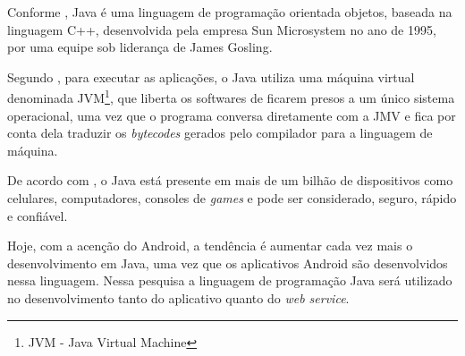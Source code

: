 
	\par Conforme , Java é uma linguagem de programação
orientada objetos, baseada na linguagem C++, desenvolvida pela empresa
Sun Microsystem no ano de {1995}, por uma equipe sob liderança de James
Gosling.

	\par Segundo , para executar as aplicações, o
Java utiliza uma máquina virtual denominada JVM\footnote{JVM - Java
Virtual Machine}, que liberta os softwares de ficarem presos a um único sistema
operacional, uma vez que o programa conversa diretamente com a JMV e fica por
conta dela traduzir os \textit{bytecodes} gerados pelo compilador para a
linguagem de máquina.

	\par De acordo com , o Java está presente em mais de
um bilhão de dispositivos como celulares, computadores, consoles de
\textit{games} e pode ser considerado, seguro, rápido e confiável.

	\par Hoje, com a acenção do Android, a tendência é aumentar cada vez mais o
desenvolvimento em Java, uma vez que os aplicativos Android são desenvolvidos
nessa linguagem. Nessa pesquisa a linguagem de programação Java será utilizado
no desenvolvimento tanto do aplicativo quanto do \textit{web service}.
